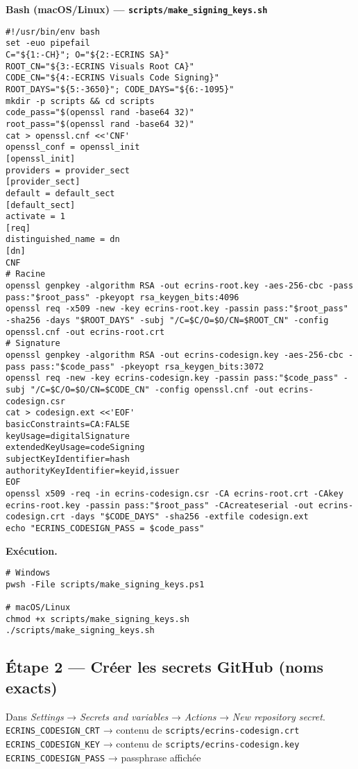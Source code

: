 \textbf{Bash (macOS/Linux) — \texttt{scripts/make\_signing\_keys.sh}}
\begin{lstlisting}[basicstyle=\ttfamily\small,breaklines=true,columns=fullflexible]
#!/usr/bin/env bash
set -euo pipefail
C="${1:-CH}"; O="${2:-ECRINS SA}"
ROOT_CN="${3:-ECRINS Visuals Root CA}"
CODE_CN="${4:-ECRINS Visuals Code Signing}"
ROOT_DAYS="${5:-3650}"; CODE_DAYS="${6:-1095}"
mkdir -p scripts && cd scripts
code_pass="$(openssl rand -base64 32)"
root_pass="$(openssl rand -base64 32)"
cat > openssl.cnf <<'CNF'
openssl_conf = openssl_init
[openssl_init]
providers = provider_sect
[provider_sect]
default = default_sect
[default_sect]
activate = 1
[req]
distinguished_name = dn
[dn]
CNF
# Racine
openssl genpkey -algorithm RSA -out ecrins-root.key -aes-256-cbc -pass pass:"$root_pass" -pkeyopt rsa_keygen_bits:4096
openssl req -x509 -new -key ecrins-root.key -passin pass:"$root_pass" -sha256 -days "$ROOT_DAYS" -subj "/C=$C/O=$O/CN=$ROOT_CN" -config openssl.cnf -out ecrins-root.crt
# Signature
openssl genpkey -algorithm RSA -out ecrins-codesign.key -aes-256-cbc -pass pass:"$code_pass" -pkeyopt rsa_keygen_bits:3072
openssl req -new -key ecrins-codesign.key -passin pass:"$code_pass" -subj "/C=$C/O=$O/CN=$CODE_CN" -config openssl.cnf -out ecrins-codesign.csr
cat > codesign.ext <<'EOF'
basicConstraints=CA:FALSE
keyUsage=digitalSignature
extendedKeyUsage=codeSigning
subjectKeyIdentifier=hash
authorityKeyIdentifier=keyid,issuer
EOF
openssl x509 -req -in ecrins-codesign.csr -CA ecrins-root.crt -CAkey ecrins-root.key -passin pass:"$root_pass" -CAcreateserial -out ecrins-codesign.crt -days "$CODE_DAYS" -sha256 -extfile codesign.ext
echo "ECRINS_CODESIGN_PASS = $code_pass"
\end{lstlisting}

\noindent\textbf{Exécution.}
\begin{verbatim}
# Windows
pwsh -File scripts/make_signing_keys.ps1

# macOS/Linux
chmod +x scripts/make_signing_keys.sh
./scripts/make_signing_keys.sh
\end{verbatim}

\subsection*{Étape 2 — Créer les secrets GitHub (noms exacts)}
Dans \textit{Settings} → \textit{Secrets and variables} → \textit{Actions} → \textit{New repository secret}.\\
\texttt{ECRINS\_CODESIGN\_CRT} → contenu de \texttt{scripts/ecrins-codesign.crt}\\
\texttt{ECRINS\_CODESIGN\_KEY} → contenu de \texttt{scripts/ecrins-codesign.key}\\
\texttt{ECRINS\_CODESIGN\_PASS} → passphrase affichée

